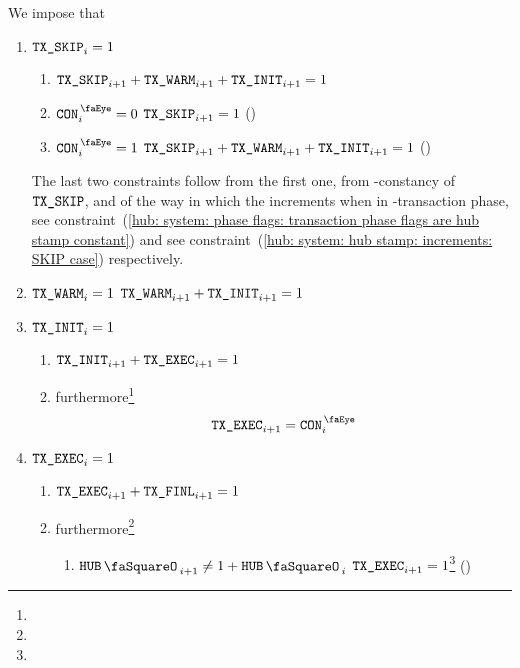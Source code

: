 We impose that
\begin{enumerate}
        \item \If $\texttt{TX}\texttt{\_SKIP} _{i} = 1$ \Then
                \begin{enumerate}
                        \item $\texttt{TX}\texttt{\_SKIP} _{i + 1} + \texttt{TX}\texttt{\_WARM} _{i + 1} + \texttt{TX}\texttt{\_INIT} _{i + 1} = 1$
                        \item \If $\peekContext _{i} = 0$ \Then $\texttt{TX}\texttt{\_SKIP} _{i + 1} = 1$ (\sanityCheck)
                        \item \If $\peekContext _{i} = 1$ \Then $\texttt{TX}\texttt{\_SKIP} _{i + 1} + \texttt{TX}\texttt{\_WARM} _{i + 1} + \texttt{TX}\texttt{\_INIT} _{i + 1} = 1$ (\sanityCheck)
                \end{enumerate}
                \saNote{}
                The last two constraints follow from the first one,
                from \hubStamp-constancy of $\texttt{TX}\texttt{\_SKIP}$,
                and of the way in which the \hubStamp{} increments when in \txSkip-transaction phase,
                see constraint~(\ref{hub: system: phase flags: transaction phase flags are hub stamp constant}) and
                see constraint~(\ref{hub: system: hub stamp: increments: SKIP case}) respectively.
        \item \If $\texttt{TX}\texttt{\_WARM} _{i} = 1$ \Then $                   \texttt{TX}\texttt{\_WARM} _{i + 1} + \texttt{TX}\texttt{\_INIT} _{i + 1} = 1$
        \item \If $\texttt{TX}\texttt{\_INIT} _{i} = 1$ \Then
                \begin{enumerate}
                        \item $\texttt{TX}\texttt{\_INIT} _{i + 1} + \texttt{TX}\texttt{\_EXEC} _{i + 1} = 1$
                        \item furthermore\footnote{}
                                \[
                                        \txExec _{i + 1} = \peekContext _{i}
                                \]
                \end{enumerate}
        \item \If $\texttt{TX}\texttt{\_EXEC} _{i} = 1$ \Then
                \begin{enumerate}
                        \item $\texttt{TX}\texttt{\_EXEC} _{i + 1} + \texttt{TX}\texttt{\_FINL} _{i + 1} = 1$
                        \item furthermore\footnote{}
                                \begin{enumerate}
                                        \item \If $\hubStamp _{i + 1} \neq 1 + \hubStamp _{i}$ \Then $\texttt{TX}\texttt{\_EXEC} _{i + 1} = 1$\footnote{} \quad (\sanityCheck)

\end{enumerate}
\end{enumerate}
\end{enumerate}
